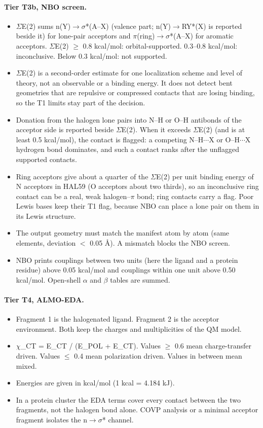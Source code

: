 \documentclass[journal=jcisd8,manuscript=suppinfo]{achemso}
\begin{document}
\begin{singlespace}
\paragraph{Tier T3b, NBO screen.}
\begin{itemize}[nosep,leftmargin=*]
\item $\Sigma$E(2) sums n(Y)$\to\sigma$*(A--X) (valence part; n(Y)$\to$RY*(X) is reported beside it) for lone-pair acceptors and $\pi$(ring)$\to\sigma$*(A--X) for aromatic acceptors. $\Sigma$E(2) $\ge$ 0.8 kcal/mol: orbital-supported. 0.3--0.8 kcal/mol: inconclusive. Below 0.3 kcal/mol: not supported.
\item $\Sigma$E(2) is a second-order estimate for one localization scheme and level of theory, not an observable or a binding energy. It does not detect bent geometries that are repulsive or compressed contacts that are losing binding, so the T1 limits stay part of the decision.
\item Donation from the halogen lone pairs into N--H or O--H antibonds of the acceptor side is reported beside $\Sigma$E(2). When it exceeds $\Sigma$E(2) (and is at least 0.5 kcal/mol), the contact is flagged: a competing N--H$\cdots$X or O--H$\cdots$X hydrogen bond dominates, and such a contact ranks after the unflagged supported contacts.
\item Ring acceptors give about a quarter of the $\Sigma$E(2) per unit binding energy of N acceptors in HAL59 (O acceptors about two thirds), so an inconclusive ring contact can be a real, weak halogen--$\pi$ bond; ring contacts carry a flag. Poor Lewis bases keep their T1 flag, because NBO can place a lone pair on them in its Lewis structure.
\item The output geometry must match the manifest atom by atom (same elements, deviation $<$ 0.05 \AA{}). A mismatch blocks the NBO screen.
\item NBO prints couplings between two units (here the ligand and a protein residue) above 0.05 kcal/mol and couplings within one unit above 0.50 kcal/mol. Open-shell $\alpha$ and $\beta$ tables are summed.
\end{itemize}
\paragraph{Tier T4, ALMO-EDA.}
\begin{itemize}[nosep,leftmargin=*]
\item Fragment 1 is the halogenated ligand. Fragment 2 is the acceptor environment. Both keep the charges and multiplicities of the QM model.
\item $\chi$\_CT = E\_CT / (E\_POL + E\_CT). Values $\ge$ 0.6 mean charge-transfer driven. Values $\le$ 0.4 mean polarization driven. Values in between mean mixed.
\item Energies are given in kcal/mol (1 kcal = 4.184 kJ).
\item In a protein cluster the EDA terms cover every contact between the two fragments, not the halogen bond alone. COVP analysis or a minimal acceptor fragment isolates the n$\to\sigma$* channel.
\end{itemize}

\end{singlespace}
\end{document}
